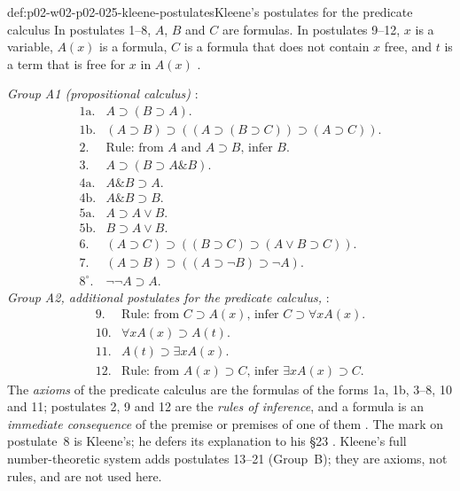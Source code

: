 \begin{hbdefinition}{def:p02-w02-p02-025-kleene-postulates}{Kleene's postulates for the predicate calculus}
In postulates 1--8, \(A\), \(B\) and \(C\) are formulas.  In postulates
9--12, \(x\) is a variable, \(A(x)\) is a formula, \(C\) is a formula that does
not contain \(x\) free, and \(t\) is a term that is free for \(x\) in
\(A(x)\) \cite[\S 19, p.~81]{Kleene1952}.

\emph{Group A1 (propositional calculus)} \cite[\S 19, p.~82]{Kleene1952}:
\[
\begin{array}{ll}
 \text{1a.} & A\supset(B\supset A).\\
 \text{1b.} & (A\supset B)\supset((A\supset(B\supset C))\supset(A\supset C)).\\
 \text{2.}  & \text{Rule: from } A \text{ and } A\supset B \text{, infer } B.\\
 \text{3.}  & A\supset(B\supset A\mathbin{\&}B).\\
 \text{4a.} & A\mathbin{\&}B\supset A.\\
 \text{4b.} & A\mathbin{\&}B\supset B.\\
 \text{5a.} & A\supset A\lor B.\\
 \text{5b.} & B\supset A\lor B.\\
 \text{6.}  & (A\supset C)\supset((B\supset C)\supset(A\lor B\supset C)).\\
 \text{7.}  & (A\supset B)\supset((A\supset\neg B)\supset\neg A).\\
 \text{8}^{\circ}. & \neg\neg A\supset A.
\end{array}
\]
\emph{Group A2, additional postulates for the predicate calculus,}
\cite[\S 19, p.~82]{Kleene1952}:
\[
\begin{array}{ll}
 \text{9.}  & \text{Rule: from } C\supset A(x) \text{, infer } C\supset\forall xA(x).\\
 \text{10.} & \forall xA(x)\supset A(t).\\
 \text{11.} & A(t)\supset\exists xA(x).\\
 \text{12.} & \text{Rule: from } A(x)\supset C \text{, infer } \exists xA(x)\supset C.
\end{array}
\]
The \emph{axioms} of the predicate calculus are the formulas of the forms 1a,
1b, 3--8, 10 and 11; postulates 2, 9 and 12 are the \emph{rules of
inference}, and a formula is an \emph{immediate consequence} of the premise
or premises of one of them \cite[\S 19, p.~82]{Kleene1952}.  The mark on
postulate~8 is Kleene's; he defers its explanation to his \S 23
\cite[\S 19, p.~82]{Kleene1952}.  Kleene's full number-theoretic system adds postulates 13--21
(Group~B); they are axioms, not rules, and are not used here.
\end{hbdefinition}

